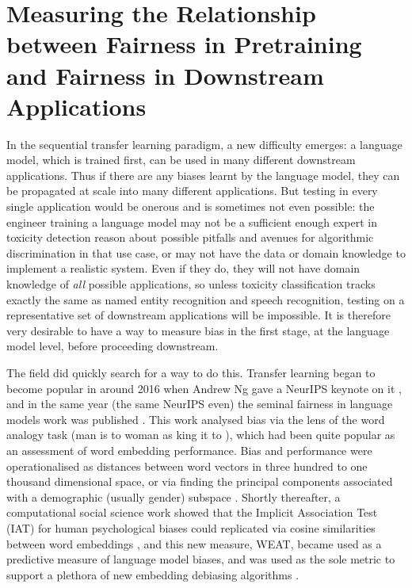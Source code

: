 \part{Measuring the Relationship between Fairness in Pretraining and Fairness in Downstream Applications}
\label{part:measurement}

In the sequential transfer learning paradigm, a new difficulty emerges: a language model, which is trained first, can be used in many different downstream applications. Thus if there are any biases learnt by the language model, they can be propagated at scale into many different applications. But testing in every single application would be onerous and is sometimes not even possible: the engineer training a language model may not be a sufficient enough expert in toxicity detection reason about possible pitfalls and avenues for algorithmic discrimination in that use case, or may not have the data or domain knowledge to implement a realistic system. Even if they do, they will not have domain knowledge of \textit{all} possible applications, so unless toxicity classification tracks exactly the same as named entity recognition and speech recognition, testing on a representative set of downstream applications will be impossible. It is therefore very desirable to have a way to measure bias in the first stage, at the language model level, before proceeding downstream. 

The field did quickly search for a way to do this. Transfer learning began to become popular in around 2016 when Andrew Ng gave a NeurIPS keynote on it \citep{ng2016nuts}, and in the same year (the same NeurIPS even) the seminal fairness in language models work was published \citep{bolukbasi}. This work analysed bias via the lens of the word analogy task (man is to woman as king it to \textunderscore), which had been quite popular as an assessment of word embedding performance. Bias and performance were operationalised as distances between word vectors in three hundred to one thousand dimensional space, or via finding the principal components associated with a demographic (usually gender) subspace \citep{ethayarajh-etal-2019-understanding}. Shortly thereafter, a computational social science work showed that the Implicit Association Test (IAT) for human psychological biases could replicated via cosine similarities between word embeddings \citet{Caliskan2017SemanticsDA}, and this new measure, WEAT, became used as a predictive measure of language model biases, and was used as the sole metric to support a plethora of new embedding debiasing algorithms \citep{list_alot}.  

